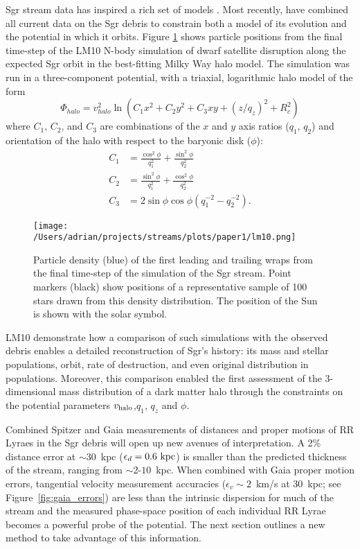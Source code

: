 \documentclass{emulateapj}
\begin{document}
Sgr stream data has inspired a rich set of  models 
\citep[e.g.,][]{johnston99b, fellhauer06}.
Most recently, \citet[][hereafter LM10]{law10} have combined all
current data on the Sgr debris to constrain both a model of its evolution
and the potential in which it orbits.
Figure \ref{fig:lm10} shows particle positions
from the final time-step of the LM10 N-body
simulation of dwarf satellite disruption along the expected Sgr orbit
in the best-fitting Milky Way halo model. The simulation was
run in a three-component potential, with a triaxial, logarithmic halo
model of the form
\begin{equation}
  \Phi_{halo} = v_{halo}^2 \ln(C_1 x^2 + C_2 y^2 + C_3 xy + (z/q_z)^2 + R_c^2)
\end{equation}
where $C_1$, $C_2$, and $C_3$ are combinations of the $x$ and $y$ axis
ratios ($q_1$, $q_2$) and orientation of the halo with respect to the
baryonic disk ($\phi$):
\begin{align}
  C_1 &= \frac{\cos^2\phi}{q_1^2} + \frac{\sin^2\phi}{q_2^2}\\
  C_2 &= \frac{\sin^2\phi}{q_1^2} + \frac{\cos^2\phi}{q_2^2}\\
  C_3 &= 2\sin\phi\cos\phi \left(q_1^{-2} - q_2^{-2}\right).
\end{align}

\begin{figure}[h]
\begin{center}
\texttt{[image: /Users/adrian/projects/streams/plots/paper1/lm10.png]}
\caption{ Particle density (blue) of the first leading and trailing wraps from the final time-step of the \citet{law10} simulation of the Sgr stream. Point markers (black) show positions of a representative sample of 100 stars drawn from this density distribution. The position of the Sun is shown with the solar symbol. }\label{fig:lm10}
\end{center}
\end{figure}

LM10 demonstrate how a comparison of such simulations with the
observed debris enables a detailed reconstruction of Sgr's history:
its mass and stellar populations, orbit, rate of destruction, and even
original distribution in populations. 
Moreover, this comparison enabled the first 
assessment of the 3-dimensional mass distribution of a dark matter
halo through the constraints on the potential parameters $v_{\rm halo}$,$q_1$, $q_z$ and $\phi$.

Combined Spitzer and Gaia measurements of distances and proper motions
of RR Lyraes in the Sgr debris will open up new avenues of
interpretation. A 2\% distance error at $\sim$30~kpc
($\epsilon_{d}=0.6~{\rm kpc}$) is smaller than the predicted thickness
of the stream, ranging from $\sim$2-$10$~kpc. When combined with Gaia proper motion errors,
tangential velocity measurement accuracies ($\epsilon_{v}\sim2$~km/s
at 30~kpc; see Figure~\ref{fig:gaia_errors}) are less than the intrinsic dispersion for much of the stream
\citep[$\sigma_v\sim10$~km/s;][]{majewski04} and the measured phase-space position of each individual RR
Lyrae becomes a powerful probe of the potential. The next section
outlines a new method to take advantage of this information.
\end{document}
